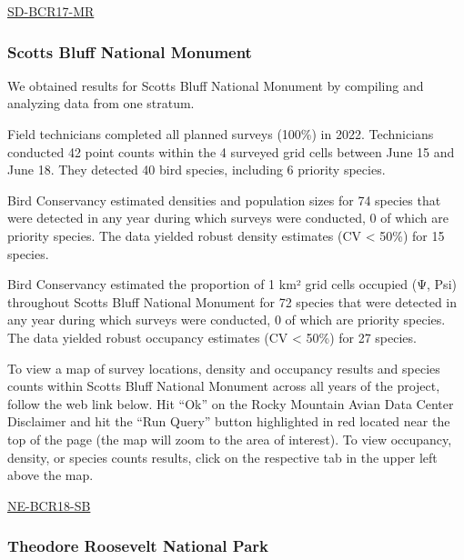 \documentclass[
  letterpaper,
  DIV=11,
  numbers=noendperiod,
  oneside]{scrreprt}
\begin{document}
\href{http://www.rmbo.org/new_site/adc/QueryWindow.aspx\#N4IgzgLgTghhCuBbEAuABCAygEQLQCEBhAJQEYB2XAWWPSoHt4A7CNY+MAC0XqgFM0AOTgBLekxgAbNAyZI+LEAF8gA=}{SD-BCR17-MR}

\hypertarget{scotts-bluff-national-monument}{%
\subsubsection{Scotts Bluff National
Monument}\label{scotts-bluff-national-monument}}

We obtained results for Scotts Bluff National Monument by compiling and
analyzing data from one stratum.

Field technicians completed all planned surveys (100\%) in 2022.
Technicians conducted 42 point counts within the 4 surveyed grid cells
between June 15 and June 18. They detected 40 bird species, including 6
priority species.

Bird Conservancy estimated densities and population sizes for 74 species
that were detected in any year during which surveys were conducted, 0 of
which are priority species. The data yielded robust density estimates
(CV \textless{} 50\%) for 15 species.

Bird Conservancy estimated the proportion of 1 km² grid cells occupied
(Ψ, Psi) throughout Scotts Bluff National Monument for 72 species that
were detected in any year during which surveys were conducted, 0 of
which are priority species. The data yielded robust occupancy estimates
(CV \textless{} 50\%) for 27 species.

To view a map of survey locations, density and occupancy results and
species counts within Scotts Bluff National Monument across all years of
the project, follow the web link below. Hit ``Ok'' on the Rocky Mountain
Avian Data Center Disclaimer and hit the ``Run Query'' button
highlighted in red located near the top of the page (the map will zoom
to the area of interest). To view occupancy, density, or species counts
results, click on the respective tab in the upper left above the map.

\href{http://www.rmbo.org/new_site/adc/QueryWindow.aspx\#N4IgzgLgTghhCuBbEAuABCAcgUQLQCEBhAJQEYAOXAZX3SoGMB7CCMNfAG3gDNu1M4AS0YA7GBzQBZUUgCmIiCAC+QA=}{NE-BCR18-SB}

\hypertarget{theodore-roosevelt-national-park}{%
\subsubsection{Theodore Roosevelt National
Park}\label{theodore-roosevelt-national-park}}
\end{document}

